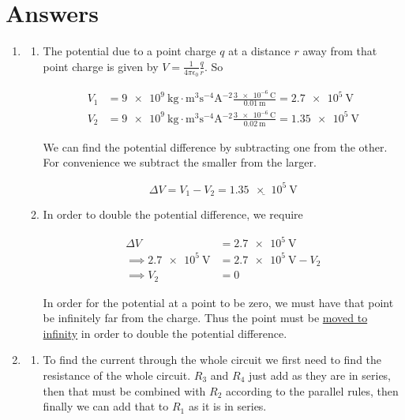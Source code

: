 \documentclass[11pt]{article}
\numberwithin{equation}{section}
\numberwithin{figure}{section}
\numberwithin{table}{section}
\begin{document}
\section*{Answers}

\begin{enumerate}
    \item \begin{enumerate}
        \item The potential due to a point charge $q$ at a distance $r$ away from that point charge is given by $V=\frac{1}{4\pi\epsilon_0}\frac{q}{r}$. So
        
        \begin{align*}
            V_1 &= \SI{9e9}{\kilo\gram\cdot\metre\cubed\second^{-4}\ampere^{-2}}\frac{\SI{3e-6}{\coulomb}}{\SI{0.01}{\metre}} = \SI{2.7e5}{\volt}\\
            V_2 &= \SI{9e9}{\kilo\gram\cdot\metre\cubed\second^{-4}\ampere^{-2}}\frac{\SI{3e-6}{\coulomb}}{\SI{0.02}{\metre}} = \SI{1.35e5}{\volt}
        \end{align*}

        We can find the potential difference by subtracting one from the other. For convenience we subtract the smaller from the larger.

        \begin{equation*}
            \Delta V = V_1-V_2 = \underline{\SI{1.35e5}{\volt}}
        \end{equation*}

        \item In order to double the potential difference, we require
        
        \begin{align*}
            \Delta V &= \SI{2.7e5}{\volt} \\
            \implies \SI{2.7e5}{\volt} &= \SI{2.7e5}{\volt} - V_2 \\
            \implies V_2 &= 0
        \end{align*}

        In order for the potential at a point to be zero, we must have that point be infinitely far from the charge. Thus the point must be \underline{moved to infinity} in order to double the potential difference.
    \end{enumerate}

    \item \begin{enumerate}
        \item To find the current through the whole circuit we first need to find the resistance of the whole circuit. $R_3$ and $R_4$ just add as they are in series, then that must be combined with $R_2$ according to the parallel rules, then finally we can add that to $R_1$ as it is in series.
        

\end{enumerate}
\end{enumerate}
\end{document}
